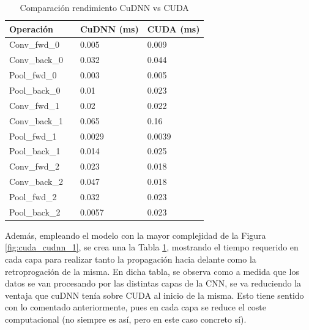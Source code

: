 \begin{table}[H]
	\centering
	\begin{tabular}{llll}
		Operación 	 &\vline  & CuDNN (ms) & CUDA (ms)  \\
		\hline
		
		Conv\_fwd\_0    & \vline & 0.005	 &	0.009 \\			
		Conv\_back\_0   & \vline & 	0.032 &	0.044 \\
		\hline
		Pool\_fwd\_0 	 & \vline & 0.003	 &	0.005 \\
		Pool\_back\_0 	 & \vline & 0.01    &	0.023 \\
		\hline
		\hline
		\hline
		Conv\_fwd\_1    & \vline & 0.02	 &	0.022	\\			
		Conv\_back\_1   & \vline & 0.065	 &	0.16	\\
		\hline
		Pool\_fwd\_1 	 & \vline & 0.0029	 &	0.0039	 \\
		Pool\_back\_1 	 & \vline  & 0.014    &	0.025	 \\
		\hline
		\hline
		\hline
		Conv\_fwd\_2    & \vline & 0.023	 &	0.018 \\			
		Conv\_back\_2   & \vline & 0.047	 &	0.018 \\
		\hline
		Pool\_fwd\_2 	 & \vline & 0.032	 &	0.023 \\
		Pool\_back\_2 	 & \vline & 0.0057    &	0.023 \\	
	\end{tabular}
	\caption{Comparación rendimiento CuDNN vs CUDA}
	\label{tabla_resultados}
\end{table}

Además, empleando el modelo con la mayor complejidad de la Figura \ref{fig:cuda_cudnn_1}, se crea una la Tabla \ref{tabla_resultados}, mostrando el tiempo requerido en cada capa para realizar tanto la propagación hacia delante como la retroprogación de la misma.
En dicha tabla, se observa como a medida que los datos se van procesando por las distintas capas de la CNN, se va reduciendo la ventaja que cuDNN tenía sobre CUDA al inicio de la misma. Esto tiene sentido con lo comentado anteriormente, pues en cada capa se reduce el coste computacional (no siempre es así, pero en este caso concreto sí).
